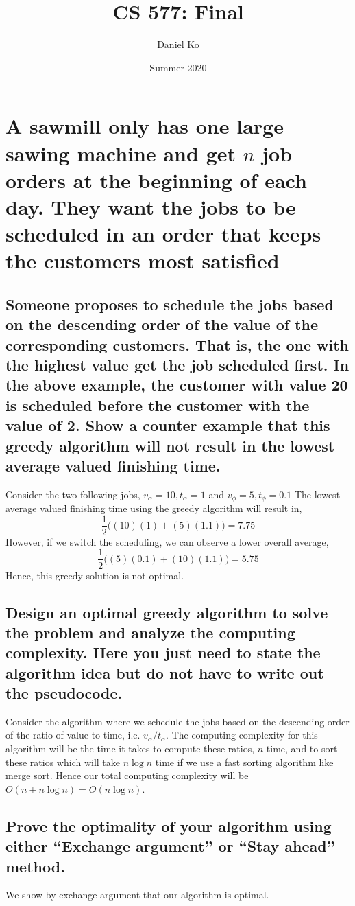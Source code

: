 \documentclass[11pt]{scrartcl}
\title{CS 577: Final}
\author{Daniel Ko}
\date{Summer 2020}
\begin{document}
\maketitle


\section{
  A sawmill only has one large sawing machine and get $n$ job orders at the
  beginning of each day. They want the jobs to be scheduled in an order that keeps the customers
  most satisfied
 }
\subsection{
	Someone proposes to schedule the jobs based on the descending order of the
	value of the corresponding customers. That is, the one with the highest value get the job
	scheduled first. In the above example, the customer with value 20 is scheduled before the
	customer with the value of 2. Show a counter example that this greedy algorithm will not
	result in the lowest average valued finishing time.
}
Consider the two following jobs, $v_\alpha = 10, t_\alpha =1$ and  $v_\phi = 5, t_\phi =0.1$
The lowest average valued finishing time using the greedy algorithm will result in,
$$
	\frac{1}{2}\Big( (10)(1) + (5)(1.1) \Big) = 7.75
$$
However, if we switch the scheduling, we can observe a lower overall average,
$$
	\frac{1}{2}\Big( (5)(0.1) + (10)(1.1) \Big) = 5.75
$$
Hence, this greedy solution is not optimal.

\subsection{
	Design an optimal greedy algorithm to solve the problem and analyze the
	computing complexity. Here you just need to state the algorithm idea but do not have to
	write out the pseudocode.
}

Consider the algorithm where we schedule the jobs based on the descending order
of the ratio of value to time, i.e. $v_\alpha / t_\alpha$.
The computing complexity for this algorithm will be the time it takes to compute these ratios, $n$ time,
and to sort these ratios which will take $n \log n$ time if we use a fast sorting algorithm like merge sort.
Hence our total computing complexity will be $O(n + n \log n) = O(n \log n)$.

\subsection{
	Prove the optimality of your algorithm using either “Exchange argument” or
	“Stay ahead” method.
}
We show by exchange argument that our algorithm is optimal.
\end{document}
